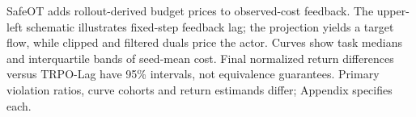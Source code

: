 SafeOT adds rollout-derived budget prices to observed-cost feedback. The upper-left schematic illustrates fixed-step feedback lag; the projection yields a target flow, while clipped and filtered duals price the actor. Curves show task medians and interquartile bands of seed-mean cost. Final normalized return differences versus TRPO-Lag have 95\% intervals, not equivalence guarantees. Primary violation ratios, curve cohorts and return estimands differ; Appendix specifies each.
